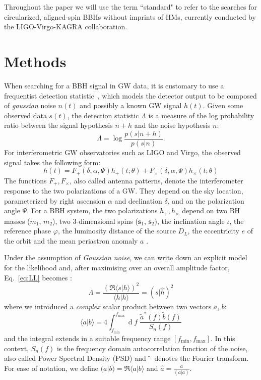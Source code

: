 \documentclass[twocolumn,showpacs,preprintnumbers,nofootinbib,prd,
superscriptaddress,10pt]{revtex4-2}
\renewcommand{\d}[1]{\ensuremath{\operatorname{d}\!{#1}}}
\newcommand{\scalar}[2]{\langle #1|#2 \rangle}
\newcommand{\rescalar}[2]{( #1 |#2 )}
\begin{document}
Throughout the paper we will use the term ``standard" to refer to the searches for circularized, aligned-spin BBHs without imprints of HMs, currently conducted by the LIGO-Virgo-KAGRA collaboration.

\section{Methods} \label{sec:methods}

When searching for a BBH signal in GW data, it is customary to use a frequentist detection statistic~\cite{Creighton_book, Maggiore:2007ulw, Harry:2016ijz, Harry:2017weg}, which models the detector output to be composed of {\it gaussian} noise $n(t)$ and possibly a known GW signal $h(t)$.
Given some observed data $s(t)$, the detection statistic $\Lambda$ is a measure of the log probability ratio between the signal hypothesis $n+h$ and the noise hypothesis $n$:
\begin{equation}\label{eq:LL}
	\Lambda = \log\frac{p(s|n+h)}{p(s| n)}.
\end{equation}
For interferometric GW observatories such as LIGO and Virgo, the observed signal takes the following form:
\begin{equation}\label{eq:signal_model}
	h(t) = F_+(\delta, \alpha, \Psi) h_+(t;\theta) + F_\times(\delta, \alpha, \Psi) h_\times(t;\theta)
\end{equation}
The functions $F_+, F_\times$, also called antenna patterns, denote the interferometer response to the two polarizations of a GW. They depend on the sky location, parameterized by right ascension $\alpha$ and declination $\delta$, and on the polarization angle $\Psi$. 
For a BBH system, the two polarizations $h_+, h_\times$ depend on two BH masses ($m_1$, $m_2$), two 3-dimensional spins ($\mathbf{s}_1$, $\mathbf{s}_2$), the inclination angle $\iota$, the reference phase $\varphi$, the luminosity distance of the source $D_L$, the eccentricity $e$ of the orbit and the mean periastron anomaly $a$ \cite{Sathyaprakash_2009}.

Under the assumption of {\it Gaussian noise}, we can write down an explicit model for the likelihood and, after maximising over an overall amplitude factor, Eq.~\eqref{eq:LL} becomes \cite{Creighton_book, Maggiore:2007ulw, Harry:2016ijz}:
\begin{equation}\label{eq:LL_gauss}
	\Lambda = \frac{\left(\Re\scalar{s}{h}\right)^2}{\scalar{h}{h}} = \rescalar{s}{\hat{h}}^2
\end{equation}
where we introduced a {\it complex} scalar product between two vectors $a$, $b$:
\begin{equation} \label{eq:scalar_product}
	\scalar{a}{b} = 4 \int_{f_\text{min}}^{f_\text{max}} \!\!\!\! \d{f} \; \frac{\tilde{a}^*(f) \tilde{b}(f)}{S_n(f)}
\end{equation}
and the integral extends in a suitable frequency range $[f_\text{min}, f_\text{max}]$.
In this context, $S_n(f)$ is the frequency domain autocorrelation function of the noise, also called Power Spectral Density (PSD) and $\tilde{\phantom{a}}$ denotes the Fourier transform.
For ease of notation, we define ${\rescalar{a}{b} = \Re\scalar{a}{b}}$ and ${\hat{a} = \frac{a}{\rescalar{a}{a}}}$.
\end{document}
